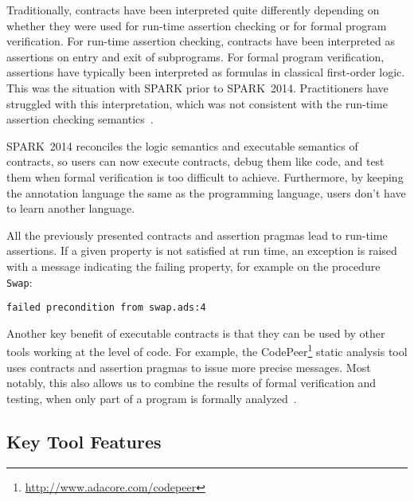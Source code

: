 \documentclass[10pt,a4paper,twocolumn]{article}
\newcommand{\newspark}{SPARK~2014\xspace}
\begin{document}
Traditionally, contracts have been interpreted quite differently
depending on whether they were used for run-time assertion checking or
for formal program verification. For run-time assertion checking,
contracts have been interpreted as assertions on entry and exit of
subprograms. For formal program verification, assertions have
typically been interpreted as formulas in classical first-order
logic. This was the situation with SPARK prior to
\newspark. Practitioners have struggled with this interpretation,
which was not consistent with the run-time assertion checking
semantics~\cite{tseChalin10}.

\newspark reconciles the logic semantics and executable semantics of
contracts, so users can now execute contracts, debug them like code,
and test them when formal verification is too difficult to
achieve. Furthermore, by keeping the annotation language the same as
the programming language, users don't have to learn another language.

All the previously presented contracts and assertion pragmas lead to
run-time assertions. If a given property is not satisfied at run time,
an exception is raised with a message indicating the failing property,
for example on the procedure \verb|Swap|:

\begin{footnotesize}
\begin{verbatim}
failed precondition from swap.ads:4
\end{verbatim}
\end{footnotesize}


Another key benefit of executable contracts is that they can be used
by other tools working at the level of code. For example, the
CodePeer\footnote{\url{http://www.adacore.com/codepeer}} static
analysis tool uses contracts and assertion pragmas to issue more
precise messages. Most notably, this also allows us to combine the results
of formal verification and testing, when only part of a program is
formally analyzed~\cite{hiliteERTS2012}.

\subsection{Key Tool Features}
\end{document}
